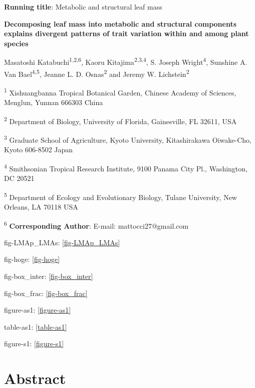 \documentclass[
  12pt,
  a4paper,
,tablecaptionabove
]{scrartcl}
\date{}
\title{}
\author{}
\begin{document}




\ifdefined\Shaded\renewenvironment{Shaded}{\begin{tcolorbox}[enhanced, sharp corners, boxrule=0pt, frame hidden, borderline west={3pt}{0pt}{shadecolor}, interior hidden, breakable]}{\end{tcolorbox}}\fi

\textbf{Running title}: Metabolic and structural leaf mass

\textbf{Decomposing leaf mass into metabolic and structural components
explains divergent patterns of trait variation within and among plant
species}

Masatoshi Katabuchi\textsuperscript{1,2,6}, Kaoru
Kitajima\textsuperscript{2,3,4}, S. Joseph Wright\textsuperscript{4},
Sunshine A. Van Bael\textsuperscript{4,5}, Jeanne L. D.
Osnas\textsuperscript{2} and Jeremy W. Lichstein\textsuperscript{2}

\textsuperscript{1} Xishuangbanna Tropical Botanical Garden, Chinese
Academy of Sciences, Menglun, Yunnan 666303 China

\textsuperscript{2} Department of Biology, University of Florida,
Gainesville, FL 32611, USA

\textsuperscript{3} Graduate School of Agriculture, Kyoto University,
Kitashirakawa Oiwake-Cho, Kyoto 606-8502 Japan

\textsuperscript{4} Smithsonian Tropical Research Institute, 9100 Panama
City Pl., Washington, DC 20521

\textsuperscript{5} Department of Ecology and Evolutionary Biology,
Tulane University, New Orleans, LA 70118 USA

\textsuperscript{6} \textbf{Corresponding Author}: E-mail:
mattocci27@gmail.com

fig-LMAp\_LMAs: \ref{fig-LMAp_LMAs}

fig-hoge: \ref{fig-hoge}

fig-box\_inter: \ref{fig-box_inter}

fig-box\_frac: \ref{fig-box_frac}

figure-as1: \ref{figure-as1}

table-as1: \ref{table-as1}

figure-s1: \ref{figure-s1}

\newpage

\hypertarget{abstract}{%
\section{Abstract}\label{abstract}}
\end{document}
